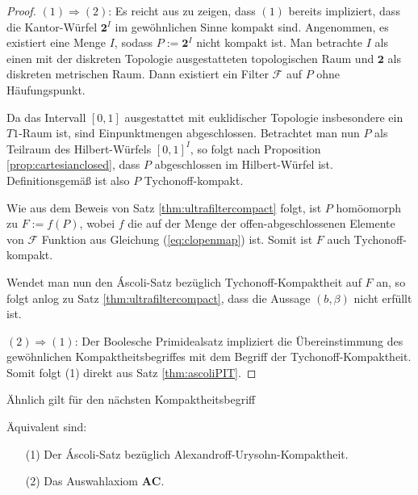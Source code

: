 \begin{proof}
  $(1)\Rightarrow(2) $: Es reicht aus zu zeigen, dass $(1)$ bereits impliziert, dass die Kantor-Würfel $\mathbf{2}^I$ im gewöhnlichen Sinne kompakt sind.
  Angenommen, es existiert eine Menge $I$, sodass $P:= \mathbf{2}^I$ nicht kompakt ist.
  Man betrachte $I$ als einen mit der diskreten Topologie ausgestatteten topologischen Raum und $\mathbf{2}$ als diskreten metrischen Raum.
  Dann existiert ein Filter $\mathcal{F}$ auf $P$ ohne Häufungspunkt.

  Da das Intervall $[0,1]$ ausgestattet mit euklidischer Topologie insbesondere ein $T1$-Raum ist, sind Einpunktmengen abgeschlossen.
  Betrachtet man nun $P$ als Teilraum des Hilbert-Würfels $[0,1]^I$, so folgt nach Proposition \ref{prop:cartesianclosed}, dass $P$ abgeschlossen im Hilbert-Würfel ist.
  Definitionsgemäß ist also $P$ Tychonoff-kompakt.

  Wie aus dem Beweis von Satz \ref{thm:ultrafiltercompact} folgt, ist $P$ homöomorph zu $F:= f(P)$, wobei $f$ die auf der Menge der offen-abgeschlossenen Elemente von $\mathcal{F}$ Funktion aus Gleichung (\ref{eq:clopenmap}) ist.
  Somit ist $F$ auch Tychonoff-kompakt.

  Wendet man nun den Áscoli-Satz bezüglich Tychonoff-Kompaktheit auf $F$ an, so folgt anlog zu Satz \ref{thm:ultrafiltercompact}, dass die Aussage $(b, \beta)$ nicht erfüllt ist.

  $(2)\Rightarrow(1)$: Der Boolesche Primidealsatz impliziert die Übereinstimmung des gewöhnlichen Kompaktheitsbegriffes mit dem Begriff der Tychonoff-Kompaktheit. Somit folgt (1) direkt aus Satz \ref{thm:ascoliPIT}.
\end{proof}

Ähnlich gilt für den nächsten Kompaktheitsbegriff

\begin{thm}
  Äquivalent sind:
  \begin{enumerate}
    \item[(1)] Der Áscoli-Satz bezüglich Alexandroff-Urysohn-Kompaktheit.
    \item[(2)] Das Auswahlaxiom $\mathbf{AC}$.
  \end{enumerate}
\end{thm}

